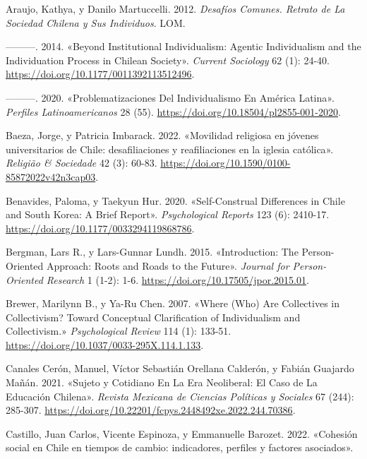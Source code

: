 \documentclass[
  letterpaper,
  DIV=11,
  numbers=noendperiod]{scrartcl}
\newlength{\cslhangindent}
\newenvironment{CSLReferences}[2] %
 {\begin{list}{}{%
  \setlength{\itemindent}{0pt}
  \setlength{\leftmargin}{0pt}
  \setlength{\parsep}{0pt}
  \ifodd #1
   \setlength{\leftmargin}{\cslhangindent}
   \setlength{\itemindent}{-1\cslhangindent}
  \fi
  \setlength{\itemsep}{#2\baselineskip}}}
 {\end{list}}
\begin{document}
\label{refs}
\begin{CSLReferences}{1}{0}
Araujo, Kathya, y Danilo Martuccelli. 2012. \emph{Desaf{í}os {Comunes}.
{Retrato} de La Sociedad Chilena y Sus Individuos}. LOM.

---------. 2014. {«Beyond Institutional Individualism: {Agentic}
Individualism and the Individuation Process in {Chilean} Society»}.
\emph{Current Sociology} 62 (1): 24-40.
\url{https://doi.org/10.1177/0011392113512496}.

---------. 2020. {«Problematizaciones Del Individualismo En {Am{é}rica
Latina}»}. \emph{Perfiles Latinoamericanos} 28 (55).
\url{https://doi.org/10.18504/pl2855-001-2020}.

Baeza, Jorge, y Patricia Imbarack. 2022. {«{Movilidad religiosa en
j{ó}venes universitarios de Chile: desafiliaciones y reafiliaciones en
la iglesia cat{ó}lica}»}. \emph{Religi{ã}o \& Sociedade} 42 (3): 60-83.
\url{https://doi.org/10.1590/0100-85872022v42n3cap03}.

Benavides, Paloma, y Taekyun Hur. 2020. {«Self-{Construal Differences}
in {Chile} and {South Korea}: {A Brief Report}»}. \emph{Psychological
Reports} 123 (6): 2410-17.
\url{https://doi.org/10.1177/0033294119868786}.

Bergman, Lars R., y Lars-Gunnar Lundh. 2015. {«Introduction: {The}
Person-Oriented Approach: {Roots} and Roads to the Future»}.
\emph{Journal for Person-Oriented Research} 1 (1-2): 1-6.
\url{https://doi.org/10.17505/jpor.2015.01}.

Brewer, Marilynn B., y Ya-Ru Chen. 2007. {«Where ({Who}) {Are
Collectives} in {Collectivism}? {Toward Conceptual Clarification} of
{Individualism} and {Collectivism}.»} \emph{Psychological Review} 114
(1): 133-51. \url{https://doi.org/10.1037/0033-295X.114.1.133}.

Canales Cerón, Manuel, Víctor Sebastián Orellana Calderón, y Fabián
Guajardo Mañán. 2021. {«Sujeto y Cotidiano En La Era Neoliberal: El Caso
de La Educaci{ó}n Chilena»}. \emph{Revista Mexicana de Ciencias
Pol{í}ticas y Sociales} 67 (244): 285-307.
\url{https://doi.org/10.22201/fcpys.2448492xe.2022.244.70386}.

Castillo, Juan Carlos, Vicente Espinoza, y Emmanuelle Barozet. 2022.
{«{Cohesi{ó}n social en Chile en tiempos de cambio: indicadores,
perfiles y factores asociados}»}.


\end{CSLReferences}
\end{document}
